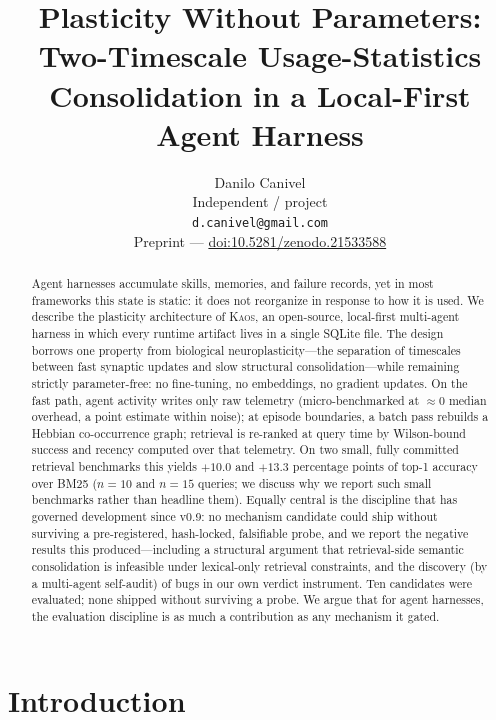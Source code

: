 \documentclass[11pt]{article}
\title{Plasticity Without Parameters: Two-Timescale Usage-Statistics\\Consolidation in a Local-First Agent Harness}
\author{
  Danilo Canivel \\
  Independent / \kaos{} project \\
  \texttt{d.canivel@gmail.com} \\[2pt]
  \small Preprint --- \href{https://doi.org/10.5281/zenodo.21533588}{doi:10.5281/zenodo.21533588}
}
\newcommand{\kaos}{\textsc{Kaos}}
\begin{document}
\maketitle

\begin{abstract}
Agent harnesses accumulate skills, memories, and failure records, yet in most frameworks this state is static: it does not reorganize in response to how it is used. We describe the plasticity architecture of \kaos{}, an open-source, local-first multi-agent harness in which every runtime artifact lives in a single SQLite file. The design borrows one property from biological neuroplasticity---the separation of timescales between fast synaptic updates and slow structural consolidation---while remaining strictly parameter-free: no fine-tuning, no embeddings, no gradient updates. On the fast path, agent activity writes only raw telemetry (micro-benchmarked at $\approx 0$ median overhead, a point estimate within noise); at episode boundaries, a batch pass rebuilds a Hebbian co-occurrence graph; retrieval is re-ranked at query time by Wilson-bound success and recency computed over that telemetry. On two small, fully committed retrieval benchmarks this yields $+10.0$ and $+13.3$ percentage points of top-1 accuracy over BM25 ($n{=}10$ and $n{=}15$ queries; we discuss why we report such small benchmarks rather than headline them). Equally central is the discipline that has governed development since v0.9: no mechanism candidate could ship without surviving a pre-registered, hash-locked, falsifiable probe, and we report the negative results this produced---including a structural argument that retrieval-side semantic consolidation is infeasible under lexical-only retrieval constraints, and the discovery (by a multi-agent self-audit) of bugs in our own verdict instrument. Ten candidates were evaluated; none shipped without surviving a probe. We argue that for agent harnesses, the evaluation discipline is as much a contribution as any mechanism it gated.
\end{abstract}

\section{Introduction}
\end{document}

